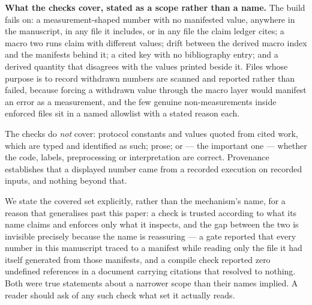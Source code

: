 \documentclass[manuscript,screen,nonacm]{acmart}
\begin{document}
\textbf{What the checks cover, stated as a scope rather than a name.} The
build fails on: a measurement-shaped number with no manifested value, anywhere
in the manuscript, in any file it includes, or in any file the claim ledger
cites; a macro two runs claim with different values; drift between the derived
macro index and the manifests behind it; a cited key with no bibliography
entry; and a derived quantity that disagrees with the values printed beside it.
Files whose purpose is to record withdrawn numbers are scanned and reported
rather than failed, because forcing a withdrawn value through the macro layer
would manifest an error as a measurement, and the few genuine non-measurements
inside enforced files sit in a named allowlist with a stated reason each.

The checks do \emph{not} cover: protocol constants and values quoted from
cited work, which are typed and identified as such; prose; or --- the important
one --- whether the code, labels, preprocessing or interpretation are correct.
Provenance establishes that a displayed number came from a recorded execution
on recorded inputs, and nothing beyond that.

We state the covered set explicitly, rather than the mechanism's name, for a
reason that generalises past this paper: a check is trusted according to what
its name claims and enforces only what it inspects, and the gap between the two
is invisible precisely because the name is reassuring --- a gate reported that
every number in this manuscript traced to a manifest while reading only the
file it had itself generated from those manifests, and a compile check reported
zero undefined references in a document carrying citations that resolved to
nothing. Both were true statements about a narrower scope than their names
implied. A reader should ask of any such check what set it actually reads.
\end{document}
